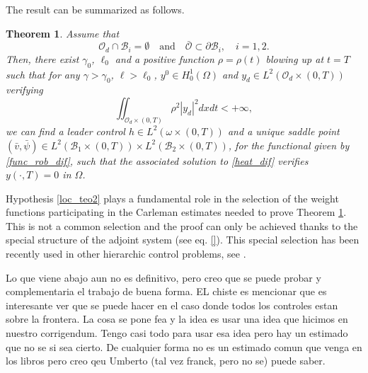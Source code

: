 \documentclass[preprint,10pt]{article}
\newtheorem{theorem}{Theorem}
\numberwithin{equation}{section}
\numberwithin{theorem}{section}
\newcommand\magenta[1]{{\color{magenta} #1}}
\begin{document}
{The result can be summarized as follows. 
%
\begin{theorem}\label{teo_main2}
Assume that 
%
\begin{equation}\label{loc_teo2}
\mathcal O_d\cap \mathcal B_i =\emptyset \quad\text{and}\quad \bar{\mathcal O}\subset \partial \mathcal B_i, \quad i=1,2.
\end{equation}
%
Then, there exist $\gamma_0$, $\ell_0$ and a positive function $\rho=\rho(t)$ blowing up at $t=T$ such that for any $\gamma>\gamma_0$, $\ell>\ell_0$, $y^0\in H_0^1(\Omega)$ and $y_d\in L^2(\mathcal O_d\times(0,T))$ verifying 
%
\begin{equation}%
\iint_{\mathcal O_d\times(0,T)}\rho^2|y_d|^2dxdt<+\infty,
\end{equation}
%
we can find a leader control $h\in L^2(\omega\times(0,T))$ and a unique saddle point $(\bar v,\bar\psi)\in L^2(\mathcal B_1\times(0,T))\times L^2(\mathcal B_2\times(0,T))$, for the functional given by \eqref{func_rob_dif}, such that the associated solution to \eqref{heat_dif} verifies $y(\cdot,T)=0$ in $\Omega$. 
%
\end{theorem}

Hypothesis \eqref{loc_teo2} plays a fundamental role in the selection of the weight functions participating in the Carleman estimates needed to prove Theorem \ref{teo_main2}. This is not a common selection and the proof can only be achieved thanks to the special structure of the adjoint system (see eq. \eqref{}). This special selection has been recently used in other hierarchic control problems, see \cite{da_silva}. 

\magenta{Lo que viene abajo aun no es definitivo, pero creo que se puede probar y complementaria el trabajo de buena forma. EL chiste es mencionar que es interesante ver que se puede hacer en el caso donde todos los controles estan sobre la frontera. La cosa se pone fea y la idea es usar una idea que hicimos en nuestro corrigendum. Tengo casi todo para usar esa idea pero hay un estimado que no se si sea cierto. De cualquier forma no es un estimado comun que venga en los libros pero creo qeu Umberto (tal vez franck, pero no se) puede saber.}

}
\end{document}
